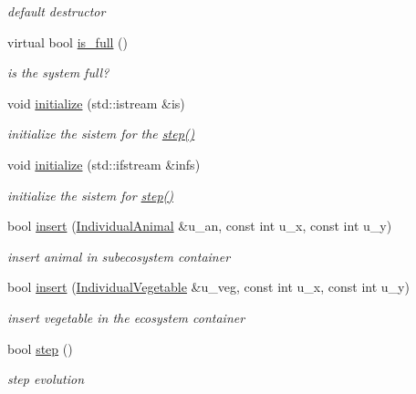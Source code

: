 \begin{DoxyCompactItemize}
\begin{DoxyCompactList}\small\item\em default destructor \end{DoxyCompactList}\item 
virtual bool \hyperlink{classEcosystemContainer_ac2c4ace58f9adbb265f61057420c5565}{is\_\-full} ()
\begin{DoxyCompactList}\small\item\em is the system full? \end{DoxyCompactList}\item 
void \hyperlink{classEcosystemContainer_a109ceeea2d948bc0d1ef407540cfb52d}{initialize} (std::istream \&is)
\begin{DoxyCompactList}\small\item\em initialize the sistem for the \hyperlink{classEcosystemContainer_a16d9614266ac07dc5252b1e731ab4712}{step()} \end{DoxyCompactList}\item 
void \hyperlink{classEcosystemContainer_a1a77a1d8297bba029bee543bed14f791}{initialize} (std::ifstream \&infs)
\begin{DoxyCompactList}\small\item\em initialize the sistem for \hyperlink{classEcosystemContainer_a16d9614266ac07dc5252b1e731ab4712}{step()} \end{DoxyCompactList}\item 
bool \hyperlink{classEcosystemContainer_a8be87beffab0799737ac8fe5091a9ff3}{insert} (\hyperlink{classIndividualAnimal}{IndividualAnimal} \&u\_\-an, const int u\_\-x, const int u\_\-y)
\begin{DoxyCompactList}\small\item\em insert animal in subecosystem container \end{DoxyCompactList}\item 
bool \hyperlink{classEcosystemContainer_a2ca198ce9aeb2082a9d5b76de4d0b45c}{insert} (\hyperlink{classIndividualVegetable}{IndividualVegetable} \&u\_\-veg, const int u\_\-x, const int u\_\-y)
\begin{DoxyCompactList}\small\item\em insert vegetable in the ecosystem container \end{DoxyCompactList}\item 
bool \hyperlink{classEcosystemContainer_a16d9614266ac07dc5252b1e731ab4712}{step} ()
\begin{DoxyCompactList}\small\item\em step evolution \end{DoxyCompactList}\item 

\end{DoxyCompactItemize}
